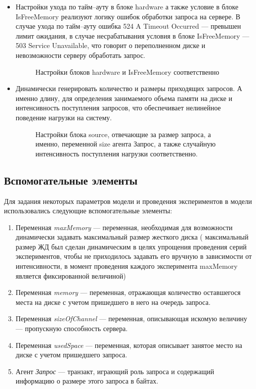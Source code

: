 \begin{itemize}
    \item Настройки ухода по тайм--ауту в блоке hardware а также условие в блоке
    IsFreeMemory реализуют логику ошибок обработки запроса на сервере. В случае
    ухода по тайм--ауту ошибка 524 A Timeout Occurred --- превышен лимит ожидания,
    в случае несрабатывания условия в блоке IsFreeMemory --- 503 Service Unavailable,
    что говорит о переполненном диске и невозможности серверу обработать запрос.

    \begin{figure} [h]
        \caption{Настройки блоков hardware и IsFreeMemory соответственно}
    \end{figure}

    \item Динамически генерировать количество и размеры приходящих запросов. А
    именно длину, для определения занимаемого объема памяти на диске и интенсивность
    поступления запросов, что обеспечивает нелинейное поведение нагрузки на систему.
    \begin{figure} [h]
        \caption{Настройки блока source, отвечающие за размер запроса, а именно,
        переменной size агента Запрос, а также случайную интенсивность поступления
        нагрузки соответственно.}
    \end{figure}
\end{itemize}

\newpage
\subsection{Вспомогательные элементы}
Для задания некоторых параметров модели и проведения экспериментов в модели использовались следующие вспомогательные элементы:
\begin{enumerate}
    \item Переменная \textit{maxMemory} --- переменная, необходимая для возможности динамически задавать максимальный размер жесткого диска (
    максимальный размер ЖД был сделан динамическим в целях упрощения проведения серий экспериментов, чтобы не приходилось задавать его вручную
    в зависимости от интенсивности, в момент проведения каждого эксперимента maxMemory является фиксированной величиной)
    \item Переменная \textit{memory} --- переменная, отражающая количество оставшегося места на диске с учетом пришедшего в него на очередь запроса.
    \item Переменная \textit{sizeOfChannel} --- переменная, описывающая искомую величину --- пропускную способность сервера.
    \item Переменная \textit{usedSpace} --- переменная, которая описывает занятое место на диске с учетом пришедшего запроса.
    \item Агент \textit{Запрос} --- транзакт, играющий роль запроса и содержащий информацию о размере этого запроса в байтах.
\end{enumerate}

